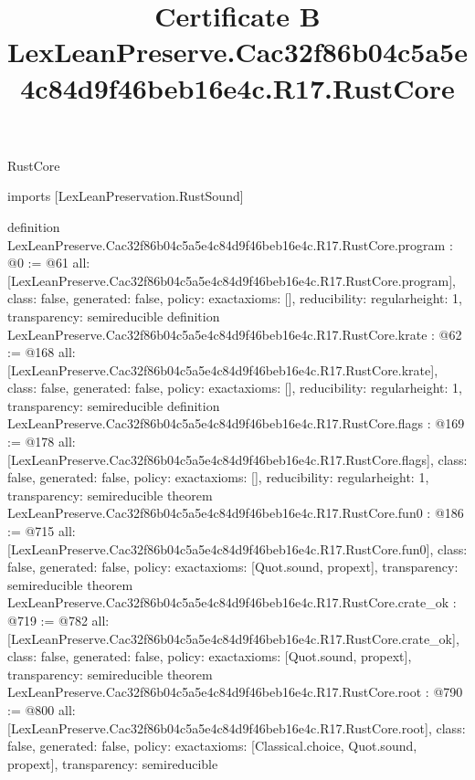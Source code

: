\begin{lexlean}{RustCore}
\title{Certificate B LexLeanPreserve.Cac32f86b04c5a5e4c84d9f46beb16e4c.R17.RustCore}
\begin{coremodule}
imports [LexLeanPreservation.RustSound]

definition LexLeanPreserve.Cac32f86b04c5a5e4c84d9f46beb16e4c.R17.RustCore.program : @0 := @61 {
  all: [LexLeanPreserve.Cac32f86b04c5a5e4c84d9f46beb16e4c.R17.RustCore.program],
  class: false,
  generated: false,
  policy: exact{axioms: []},
  reducibility: regular{height: 1},
  transparency: semireducible
}
definition LexLeanPreserve.Cac32f86b04c5a5e4c84d9f46beb16e4c.R17.RustCore.krate : @62 := @168 {
  all: [LexLeanPreserve.Cac32f86b04c5a5e4c84d9f46beb16e4c.R17.RustCore.krate],
  class: false,
  generated: false,
  policy: exact{axioms: []},
  reducibility: regular{height: 1},
  transparency: semireducible
}
definition LexLeanPreserve.Cac32f86b04c5a5e4c84d9f46beb16e4c.R17.RustCore.flags : @169 := @178 {
  all: [LexLeanPreserve.Cac32f86b04c5a5e4c84d9f46beb16e4c.R17.RustCore.flags],
  class: false,
  generated: false,
  policy: exact{axioms: []},
  reducibility: regular{height: 1},
  transparency: semireducible
}
theorem LexLeanPreserve.Cac32f86b04c5a5e4c84d9f46beb16e4c.R17.RustCore.fun0 : @186 := @715 {
  all: [LexLeanPreserve.Cac32f86b04c5a5e4c84d9f46beb16e4c.R17.RustCore.fun0],
  class: false,
  generated: false,
  policy: exact{axioms: [Quot.sound, propext]},
  transparency: semireducible
}
theorem LexLeanPreserve.Cac32f86b04c5a5e4c84d9f46beb16e4c.R17.RustCore.crate_ok : @719 := @782 {
  all: [LexLeanPreserve.Cac32f86b04c5a5e4c84d9f46beb16e4c.R17.RustCore.crate_ok],
  class: false,
  generated: false,
  policy: exact{axioms: [Quot.sound, propext]},
  transparency: semireducible
}
theorem LexLeanPreserve.Cac32f86b04c5a5e4c84d9f46beb16e4c.R17.RustCore.root : @790 := @800 {
  all: [LexLeanPreserve.Cac32f86b04c5a5e4c84d9f46beb16e4c.R17.RustCore.root],
  class: false,
  generated: false,
  policy: exact{axioms: [Classical.choice, Quot.sound, propext]},
  transparency: semireducible
}


\end{coremodule}
\end{lexlean}
